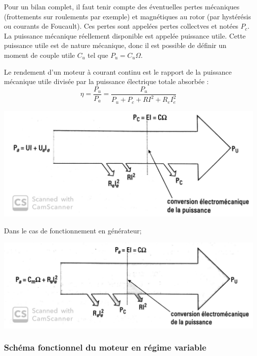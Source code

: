 \documentclass{article}
\begin{document}
Pour un bilan complet, il faut tenir compte des éventuelles pertes mécaniques (frottements sur roulements par exemple) et magnétiques au rotor (par hystérésis ou courants de Foucault). Ces pertes sont appelées pertes collectves et notées $P_c$. La puissance mécanique réellement disponible est appelée puissance utile. Cette puissance utile est de nature mécanique, donc il est possible de définir un moment de couple utile $C_u$ tel que $P_u = C_u \Omega$.\medskip

Le rendement d'un moteur à courant continu est le rapport de la puissance mécanique utile divisée par la puissance électrique totale absorbée : 
\begin{equation}
    \eta = \frac{P_u}{P_a} = \frac{P_u}{P_u + P_c + RI^2 + R_e I_e^2}
\end{equation}

\medskip

\begin{center}
    \includegraphics[scale=0.18]{puissancemoteur.jpg}
\end{center}


Dans le cas de fonctionnement en générateur;

\begin{center}
    \includegraphics[scale=0.18]{puissanceg.jpg}
\end{center}



\subsubsection{Schéma fonctionnel du moteur en régime variable}
\end{document}

